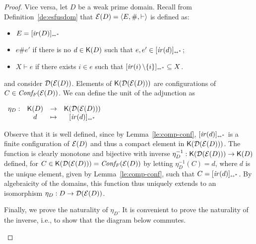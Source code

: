 \begin{proof}
  \bigskip

  Vice versa, let $D$ be a weak prime domain. Recall from Definition~\ref{de:esfusdom} that 
  $\mathcal{E}({D}) = \langle E, \#, \vdash \rangle$ is defined as:
  \begin{itemize}
  \item $E =  [{\mathop{\mathit{ir}({D})}}]_{\scriptscriptstyle {\leftrightarrow^*}}$
  \item $e \# e'$ if there is no $d \in \mathop{\mathsf{K}({D})}$ such that
    $e, e' \in [{\mathop{\mathit{ir}({d})}}]_{\scriptscriptstyle {\leftrightarrow^*}}$;
  \item $X \vdash e$ if there exists $i \in e$ such that
    $[{\mathop{\mathit{ir}({i})} \setminus \{ i \}}]_{\scriptscriptstyle {\leftrightarrow^*}} \subseteq X$.
  \end{itemize}
  and consider $\mathcal{D}({\mathcal{E}({D})})$.  Elements of $\mathop{\mathsf{K}({\mathcal{D}({\mathcal{E}({D})})})}$
  are configurations of $C \in \mathit{Conf_F}({\mathcal{E}({D})})$.  
  We can define the {unit} of the adjunction as
  \begin{center}
    $\begin{array}{lccc}
       \eta_{D} : & \mathop{\mathsf{K}({D})} &  \to & \mathop{\mathsf{K}({\mathcal{D}({\mathcal{E}({D})})})}\\
                  & d & \mapsto & [{\mathop{\mathit{ir}({d})}}]_{\scriptscriptstyle {\leftrightarrow^*}}
     \end{array}
     $
  \end{center}
  Observe that it is well defined, since by Lemma~\ref{le:comp-conf},
  $[{\mathop{\mathit{ir}({d})}}]_{\scriptscriptstyle {\leftrightarrow^*}}$ is a finite configuration of $\mathcal{E}({D})$ and thus
  a compact element in $\mathop{\mathsf{K}({\mathcal{D}({\mathcal{E}({D})})})}$.  The function is
  clearly monotone and bijective with inverse
  $\eta_D^{-1} : \mathop{\mathsf{K}({\mathcal{D}({\mathcal{E}({D})})})} \to \mathop{\mathsf{K}({D})}$ defined, for
  $C \in \mathop{\mathsf{K}({\mathcal{D}({\mathcal{E}({D})})})} = \mathit{Conf_F}({\mathcal{E}({D})})$ by letting
  $\eta_D^{-1}(C) = d$, where $d$ is the unique element, given by
  Lemma~\ref{le:comp-conf}, such that $C = [{\mathop{\mathit{ir}({d})}}]_{\scriptscriptstyle {\leftrightarrow^*}}$.
  By
  algebraicity of the domains, this function thus uniquely extends to
  an isomorphism $\eta_D : D \to \mathcal{D}({\mathcal{E}({D})})$.

  Finally, we prove the naturality of $\eta_D$. It is convenient to
  prove the naturality of the inverse, i.e., to show that the diagram
  below commutes.
  \begin{center}
  \end{center}
  

\end{proof}
